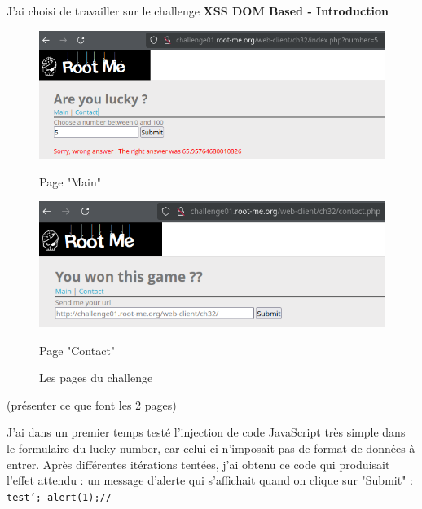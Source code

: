 \documentclass[12pt,a4paper]{article}
\begin{document}
	J'ai choisi de travailler sur le challenge \textbf{XSS DOM Based - Introduction}	
	
\begin{figure}[!h]
    \centering
    \begin{minipage}{0.45\textwidth}
        \centering
        \includegraphics[scale=0.5]{xss_page_lucky_number.png}
        \caption{Page "Main"}
    \end{minipage}
    \begin{minipage}{0.45\textwidth}
        \centering
        \includegraphics[scale=0.5]{xss_page_contact.png}
        \caption{Page "Contact"}
    \end{minipage}
    \caption{Les pages du challenge}
\end{figure}

(présenter ce que font les 2 pages)


J'ai dans un premier temps testé l'injection de code JavaScript très simple dans le formulaire du lucky number, car celui-ci n'imposait pas de format de données à entrer. Après différentes itérations tentées, j'ai obtenu ce code qui produisait l'effet attendu : un message d'alerte qui s'affichait quand on clique sur "Submit" : \texttt{test'; alert(1);//}
\end{document}
